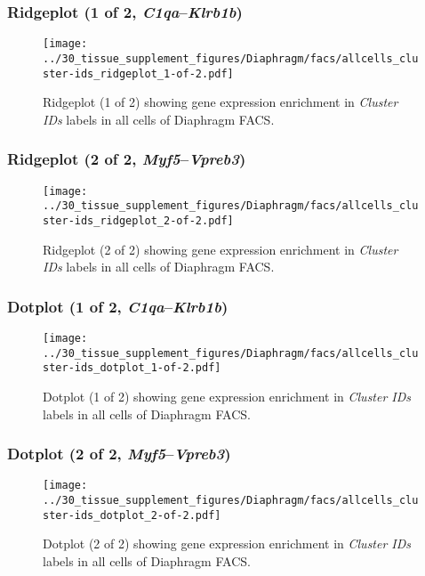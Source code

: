 \clearpage

\subsubsection{Ridgeplot (1 of 2, \emph{C1qa}--\emph{Klrb1b})}
\begin{figure}[h]
\centering
\texttt{[image: ../30\_tissue\_supplement\_figures/Diaphragm/facs/allcells\_cluster-ids\_ridgeplot\_1-of-2.pdf]}

\caption{ Ridgeplot (1 of 2)  showing gene expression enrichment in \emph{Cluster IDs} labels in all cells of Diaphragm FACS. }
\end{figure}


\clearpage

\subsubsection{Ridgeplot (2 of 2, \emph{Myf5}--\emph{Vpreb3})}
\begin{figure}[h]
\centering
\texttt{[image: ../30\_tissue\_supplement\_figures/Diaphragm/facs/allcells\_cluster-ids\_ridgeplot\_2-of-2.pdf]}

\caption{ Ridgeplot (2 of 2)  showing gene expression enrichment in \emph{Cluster IDs} labels in all cells of Diaphragm FACS. }
\end{figure}


\clearpage

\subsubsection{Dotplot (1 of 2, \emph{C1qa}--\emph{Klrb1b})}
\begin{figure}[h]
\centering
\texttt{[image: ../30\_tissue\_supplement\_figures/Diaphragm/facs/allcells\_cluster-ids\_dotplot\_1-of-2.pdf]}

\caption{ Dotplot (1 of 2)  showing gene expression enrichment in \emph{Cluster IDs} labels in all cells of Diaphragm FACS. }
\end{figure}


\clearpage

\subsubsection{Dotplot (2 of 2, \emph{Myf5}--\emph{Vpreb3})}
\begin{figure}[h]
\centering
\texttt{[image: ../30\_tissue\_supplement\_figures/Diaphragm/facs/allcells\_cluster-ids\_dotplot\_2-of-2.pdf]}

\caption{ Dotplot (2 of 2)  showing gene expression enrichment in \emph{Cluster IDs} labels in all cells of Diaphragm FACS. }
\end{figure}

